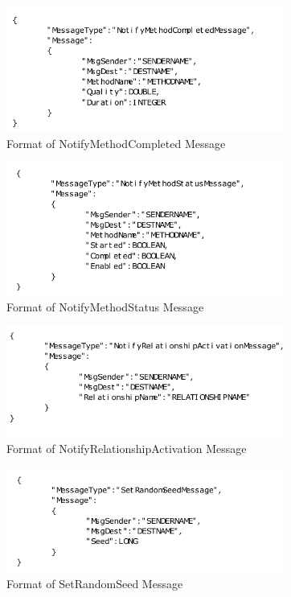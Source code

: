 \begin{enumerate}
\begin{figure}[H]
\centering
\includegraphics[width=3.6in]{figs/NotifyMethodCompleted.pdf}
\caption{Format of NotifyMethodCompleted Message}
\label{fig:NotifyMethodCompleted}
\end{figure}

\begin{figure}[H]
\centering
\includegraphics[width=3.6in]{figs/NotifyMethodStatus.pdf}
\caption{Format of NotifyMethodStatus Message}
\label{fig:NotifyMethodStatus}
\end{figure}

\begin{figure}[H]
\centering
\includegraphics[width=3.6in]{figs/NotifyRelationshipActivation.pdf}
\caption{Format of NotifyRelationshipActivation Message}
\label{fig:NotifyRelationshipActivation}
\end{figure}

\begin{figure}[H]
\centering
\includegraphics[width=3.6in]{figs/SetRandomSeed.pdf}
\caption{Format of SetRandomSeed Message}
\label{fig:SetRandomSeed}
\end{figure}


\end{enumerate}
